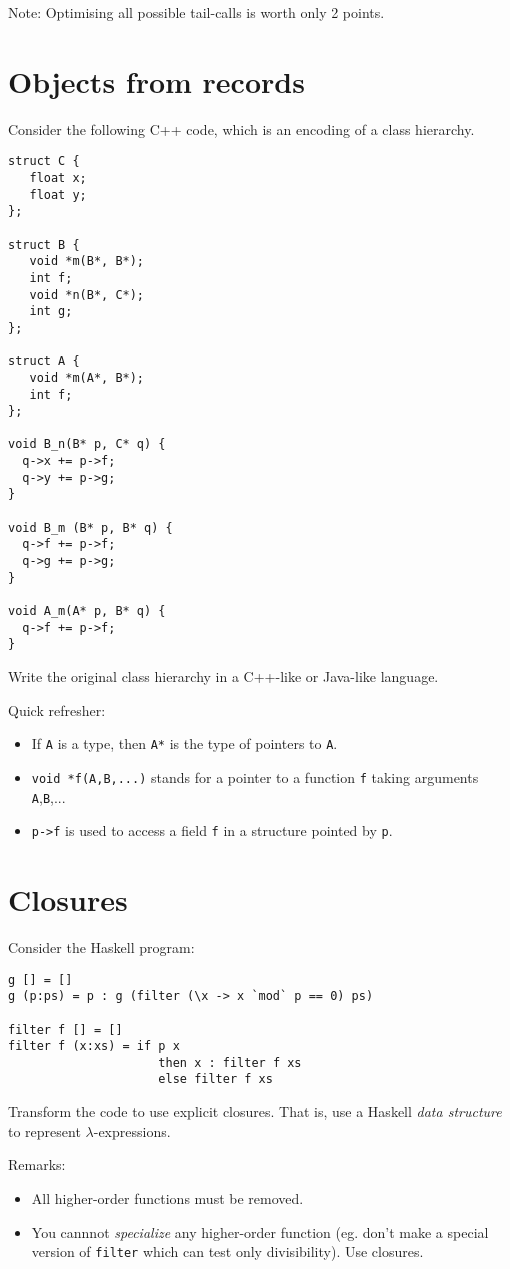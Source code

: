 \documentclass{article}
\begin{document}
Note: Optimising all possible tail-calls is worth only 2 points.

\newpage
\section{Objects from records}

Consider the following C++ code, which is an encoding of a class
hierarchy.
\begin{verbatim}
struct C {
   float x;
   float y;
};

struct B {
   void *m(B*, B*);
   int f;
   void *n(B*, C*);
   int g;
};

struct A {
   void *m(A*, B*);
   int f;
};

void B_n(B* p, C* q) {
  q->x += p->f;
  q->y += p->g;
}

void B_m (B* p, B* q) {
  q->f += p->f;
  q->g += p->g;
}

void A_m(A* p, B* q) {
  q->f += p->f;
}
\end{verbatim}

Write the original class hierarchy in a C++-like or Java-like language.

Quick refresher:
\begin{itemize}
\item If \texttt{A} is a type, then \texttt{A*} is the type of
  pointers to \texttt{A}.
\item \texttt{void *f(A,B,...)} stands for a pointer to a function
  \texttt{f} taking arguments \texttt{A},\texttt{B},...
\item \texttt{p->f} is used to access a field \texttt{f} in a
  structure pointed by \texttt{p}.
\end{itemize}
\newpage
\section{Closures}
Consider the Haskell program:

\begin{verbatim}
g [] = []
g (p:ps) = p : g (filter (\x -> x `mod` p == 0) ps)

filter f [] = []
filter f (x:xs) = if p x 
                     then x : filter f xs  
                     else filter f xs
\end{verbatim}

Transform the code to use explicit closures. That is, use a Haskell
\emph{data structure} to represent $\lambda$-expressions.

Remarks:
\begin{itemize}
\item All higher-order functions must be removed.
\item You cannnot \emph{specialize} any higher-order function
  (eg. don't make a special version of \texttt{filter} which can test
  only divisibility).  Use closures.
\end{itemize}
\end{document}

